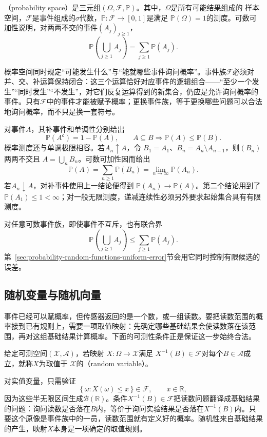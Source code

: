 \begin{definition}[概率空间]
  \label{def:probability-space}
（probability space）是三元组\((\Omega,\mathcal{F},\mathbb{P})\)。其中，\(\Omega\)是所有可能结果组成的
样本空间，\(\mathcal{F}\)是事件组成的\(\sigma\)代数，\(\mathbb{P}:\mathcal{F}\to[0,1]\)是满足
\(\mathbb{P}(\Omega)=1\)的测度。可数可加性说明，对两两不交的事件\((A_j)_{j\geq1}\)，
\[ \mathbb{P}\left(\bigcup_{j\geq1}A_j\right)
  =\sum_{j\geq1}\mathbb{P}(A_j). \]
\end{definition}
概率空间同时规定“可能发生什么”与“能就哪些事件询问概率”。事件族\(\mathcal F\)必须对并、交、补运算保持闭合：这三个运算恰好对应事件的逻辑组合——“至少一个发生”“同时发生”“不发生”，对它们反复运算得到的新集合，仍应是允许询问概率的事件。只有\(\mathcal F\)中的事件才能被赋予概率；更换事件族，等于更换哪些问题可以合法地询问概率，而不只是换一套符号。

对事件\(A\)，其补事件和单调性分别给出
\[ \mathbb{P}(A^{\mathsf c})=1-\mathbb{P}(A),
  \qquad A\subseteq B\Longrightarrow\mathbb{P}(A)\leq\mathbb{P}(B). \]
概率测度还与单调极限相容。若\(A_n\uparrow A\)，令
\(B_1=A_1\)、\(B_n=A_n\setminus A_{n-1}\)，则\((B_n)\)两两不交且
\(A=\bigcup_nB_n\)。可数可加性因而给出
\[
  \mathbb{P}(A)
  =\sum_{n\geq1}\mathbb{P}(B_n)
  =\lim_{n\to\infty}\mathbb{P}(A_n).
\]
若\(A_n\downarrow A\)，对补事件使用上一结论便得到
\(\mathbb{P}(A_n)\to\mathbb{P}(A)\)。第二个结论用到了
\(\mathbb{P}(A_1)\leq1<\infty\)；对一般无限测度，递减连续性必须另外要求起始集合具有有限测度。

对任意可数事件族，即使事件不互斥，也有联合界
\begin{equation}
  \mathbb{P}\left(\bigcup_{j\geq1}A_j\right)
  \leq
  \sum_{j\geq1}\mathbb{P}(A_j).
  \label{eq:probability-union-bound}
\end{equation}
第~\ref{sec:probability-random-functions-uniform-error}节会用它同时控制有限候选的误差。
\subsection{随机变量与随机向量}
事件已经可以赋概率，但传感器返回的是一个数，或一组读数。要把读数范围的概率接到已有规则上，需要一项取值映射：先确定哪些基础结果会使读数落在该范围，再对这组基础结果计算概率。下面的可测性条件正是保证这一步始终合法。
\begin{definition}[随机变量]
  \label{def:probability-random-variable}
给定可测空间\((\mathcal{X},\mathcal{A})\)，若映射
\(X:\Omega\to\mathcal{X}\)满足
\(X^{-1}(B)\in\mathcal{F}\)对每个\(B\in\mathcal{A}\)成立，就称\(X\)为取值于
\(\mathcal{X}\)的（random variable）。
\end{definition}
对实值变量，只需验证
\[ \{\,\omega:X(\omega)\leq x\,\}\in\mathcal{F},
  \qquad x\in\mathbb{R}, \]
因为这些半无限区间生成\(\mathcal{B}(\mathbb{R})\)。条件\(X^{-1}(B)\in\mathcal F\)把读数问题翻译成基础结果的问题：询问读数是否落在\(B\)内，等价于询问实验结果是否落在\(X^{-1}(B)\)内。只要这个原像是事件族中的一员，读数范围就有定义好的概率。随机性来自基础结果的产生，映射\(X\)本身是一项确定的取值规则。

